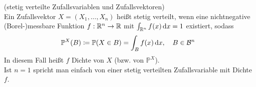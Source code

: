 \begin{Definition}(stetig verteilte Zufallsvariablen und Zufallsvektoren)\\
	Ein Zufallsvektor $ X = (X_1,\dots,X_n) $ heißt stetig verteilt, wenn eine nichtnegative (Borel-)messbare Funktion $ f : \mathbb{R}^n \to \mathbb{R} $ mit $ \int_{\mathbb{R}^n} f(x) \, \mathrm{d} x =1  $ existiert, sodass 
	\[
		\mathbb{P}^X(B) \coloneqq \mathbb{P}(X \in B) =  \int_{B} f(x) \, \mathrm{d} x, \quad B \in \mathcal{B}^n
	\]
	In diesem Fall heißt $ f $ Dichte von $ X $ (bzw. von $ \mathbb{P}^X $).\\
	Ist $ n=1 $ spricht man einfach von einer stetig verteilten Zufallsvariable mit Dichte $ f $.
	
\end{Definition}

